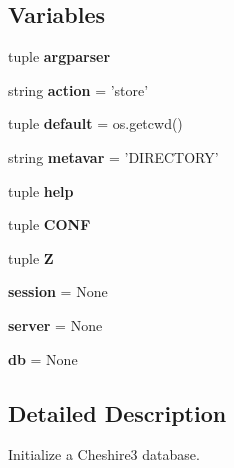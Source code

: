 \subsection*{Variables}
\begin{DoxyCompactItemize}
\item 
tuple {\bfseries argparser}
\item 
\hypertarget{namespacecheshire3_1_1commands_1_1init_a1e1644dc070dbdf4edba57f05a63bab8}{string {\bfseries action} = 'store'}\label{namespacecheshire3_1_1commands_1_1init_a1e1644dc070dbdf4edba57f05a63bab8}

\item 
\hypertarget{namespacecheshire3_1_1commands_1_1init_a1bf985a5c23017e2cb300c00295a95ef}{tuple {\bfseries default} = os.\-getcwd()}\label{namespacecheshire3_1_1commands_1_1init_a1bf985a5c23017e2cb300c00295a95ef}

\item 
\hypertarget{namespacecheshire3_1_1commands_1_1init_aa9ecd25e805db36b6eed859db6201f9e}{string {\bfseries metavar} = 'D\-I\-R\-E\-C\-T\-O\-R\-Y'}\label{namespacecheshire3_1_1commands_1_1init_aa9ecd25e805db36b6eed859db6201f9e}

\item 
tuple {\bfseries help}
\item 
tuple {\bfseries C\-O\-N\-F}
\item 
tuple {\bfseries Z}
\item 
\hypertarget{namespacecheshire3_1_1commands_1_1init_a4baee7138d41b110eaf54c062d759684}{{\bfseries session} = None}\label{namespacecheshire3_1_1commands_1_1init_a4baee7138d41b110eaf54c062d759684}

\item 
\hypertarget{namespacecheshire3_1_1commands_1_1init_a292574784d1ffffb4faa92d71e5b3b31}{{\bfseries server} = None}\label{namespacecheshire3_1_1commands_1_1init_a292574784d1ffffb4faa92d71e5b3b31}

\item 
\hypertarget{namespacecheshire3_1_1commands_1_1init_af1569d47316cd30db2dba3614284c5c4}{{\bfseries db} = None}\label{namespacecheshire3_1_1commands_1_1init_af1569d47316cd30db2dba3614284c5c4}

\end{DoxyCompactItemize}


\subsection{Detailed Description}
\begin{DoxyVerb}Initialize a Cheshire3 database.\end{DoxyVerb}
 

